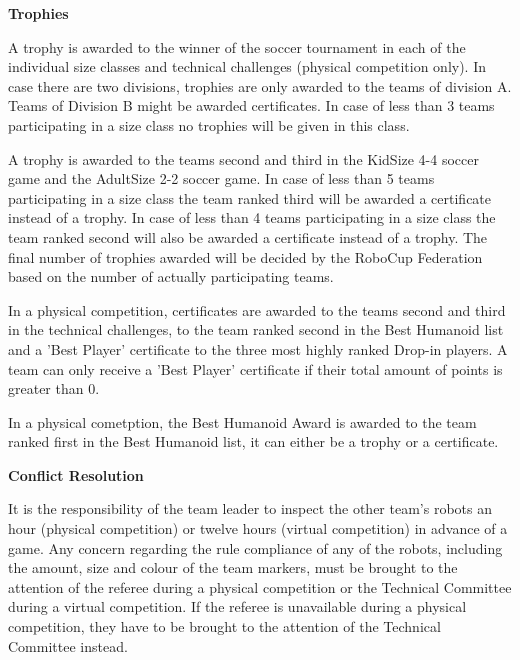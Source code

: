 \bigskip

{\bfseries Trophies}

\headlinebox

A trophy is awarded to the winner of the soccer tournament in each of the
individual size classes and technical challenges (physical competition only).
In case there are two divisions, trophies are only awarded to the teams
of division A. Teams of Division B might be awarded certificates.
In case of less than 3 teams participating in a size class no trophies will be
given in this class.

\bigskip

A trophy is awarded to the teams second and third in the KidSize 4-4 soccer game
and the AdultSize 2-2 soccer game.
In case of less than 5 teams participating in a size class the team ranked third
will be awarded a certificate instead of a trophy.
In case of less than 4 teams participating in a size class the team ranked
second will also be awarded a certificate instead of a trophy.
The final number of trophies awarded will be decided by the RoboCup Federation
based on the number of actually participating teams.

\bigskip

In a physical competition, certificates are awarded to the teams second and third in the technical challenges,
to the team ranked second in the Best Humanoid list
and a 'Best Player' certificate to the three most highly ranked Drop-in players.
A team can only receive a 'Best Player' certificate if their total amount of
points is greater than 0.

\bigskip

In a physical cometption, the Best Humanoid Award is awarded to the team ranked first in the Best Humanoid list,
it can either be a trophy or a certificate.

\bigskip


{\bfseries Conflict Resolution}

\headlinebox

It is the responsibility of the team leader to inspect the other team's
robots an hour (physical competition) or twelve hours (virtual competition) in advance of a game.
Any concern regarding the rule compliance of any of the
robots, including the amount, size and colour of the team markers, must be
brought to the attention of the referee during a physical competition or the Technical Committee during a virtual competition.
If the referee is unavailable during a physical competition, they have to be brought to the attention
  of the Technical Committee instead.



